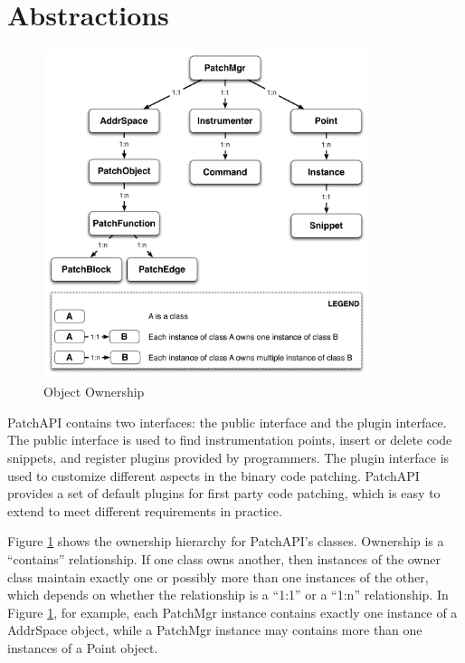 \section{Abstractions}
\label{sec-abs}

\begin{figure}[ht!]
\centerline{\includegraphics[width=0.85\textwidth]{./figure/abstraction/img.pdf}}
\caption{\label{fig:abs}Object Ownership}
\end{figure}


PatchAPI contains two interfaces: the public interface and the plugin interface.
The public interface is used to find instrumentation points, insert or delete
code snippets, and register plugins provided by programmers. The plugin
interface is used to customize different aspects in the binary code patching.
PatchAPI provides a set of default plugins for first party code patching, which
is easy to extend to meet different requirements in practice.

Figure \ref{fig:abs} shows the ownership hierarchy for PatchAPI's classes.
Ownership is a ``contains'' relationship. If one class owns another, then
instances of the owner class maintain exactly one or possibly more than one
instances of the other, which depends on whether the relationship is a ``1:1''
or a ``1:n'' relationship. In Figure \ref{fig:abs}, for example, each PatchMgr
instance contains exactly one instance of a AddrSpace object, while a PatchMgr
instance may contains more than one instances of a Point object.

